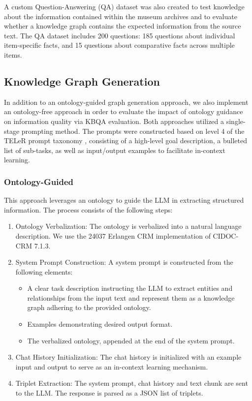 \documentclass[a4, conference]{IEEEtran}
\begin{document}
A custom Question-Answering (QA) dataset was also created to test knowledge about the information contained within the museum archives and to evaluate whether a knowledge graph contains the expected information from the source text. The QA dataset includes 200 questions: 185 questions about individual item-specific facts, and 15 questions about comparative facts across multiple items.

\subsection{Knowledge Graph Generation}

In addition to an ontology-guided graph generation approach, we also implement an ontology-free approach in order to evaluate the impact of ontology guidance on information quality via KBQA evaluation. Both approaches utilized a single-stage prompting method. The prompts were constructed based on level 4 of the TELeR prompt taxonomy \cite{santu2023telergeneraltaxonomyllm}, consisting of a high-level goal description, a bulleted list of sub-tasks, as well as input/output examples to facilitate in-context learning.

\subsubsection{Ontology-Guided}

This approach leverages an ontology to guide the LLM in extracting structured information. The process consists of the following steps:

\begin{enumerate}
    \item Ontology Verbalization: The ontology is verbalized into a natural language description. We use the 24037 Erlangen CRM implementation of CIDOC-CRM 7.1.3.
    \item System Prompt Construction: A system prompt is constructed from the following elements:
          \begin{itemize}
              \item A clear task description instructing the LLM to extract entities and relationships from the input text and represent them as a knowledge graph adhering to the provided ontology.
              \item Examples demonstrating desired output format.
              \item The verbalized ontology, appended at the end of the system prompt.
          \end{itemize}
    \item Chat History Initialization: The chat history is initialized with an example input and output to serve as an in-context learning mechanism.
    \item Triplet Extraction: The system prompt, chat history and text chunk are sent to the LLM. The response is parsed as a JSON list of triplets.
\end{enumerate}
\end{document}
